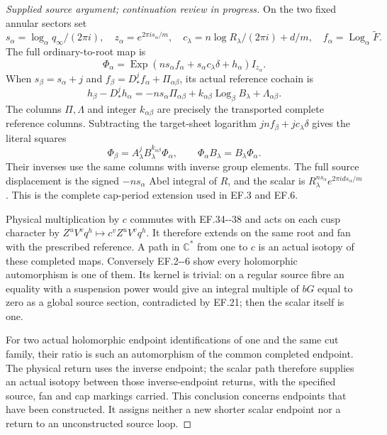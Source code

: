 \begin{proof}[Supplied source argument; continuation review in progress]
On the two fixed annular sectors set
\[
 s_\alpha=\log_\alpha q_\infty/(2\pi i),\quad
 z_\alpha=e^{2\pi i s_\alpha/m},\quad
 c_\lambda=n\log R_\lambda/(2\pi i)+d/m,\quad
 f_\alpha=\operatorname{Log}_\alpha\widetilde F.
\]
The full ordinary-to-root map is
\[
 \Phi_\alpha=\operatorname{Exp}
  (n s_\alpha f_\alpha+s_\alpha c_\lambda\delta+h_\alpha)
                                                     I_{z_\alpha}.
 \tag{EF.36}
\]
When \(s_\beta=s_\alpha+j\) and
\(f_\beta=D_*^jf_\alpha+\Pi_{\alpha\beta}\), its actual
reference cochain is
\[
 h_\beta-D_*^jh_\alpha
 =-n s_\alpha\Pi_{\alpha\beta}
       +k_{\alpha\beta}\operatorname{Log}_\beta B_\lambda
       +\Lambda_{\alpha\beta}.
 \tag{EF.37}
\]
The columns \(\Pi,\Lambda\) and integer \(k_{\alpha\beta}\)
are precisely the transported complete reference columns. Subtracting
the target-sheet logarithm \(jn f_\beta+jc_\lambda\delta\)
gives the literal squares
\[
 \Phi_\beta=A_\lambda^jB_\lambda^{k_{\alpha\beta}}\Phi_\alpha,
 \qquad \Phi_\alpha B_\lambda=B_\lambda\Phi_\alpha.
 \tag{EF.38}
\]
Their inverses use the same columns with inverse group elements. The
full source displacement is the signed \(-n s_\alpha\) Abel
integral of \(R\), and the scalar is
\(R_\lambda^{n s_\alpha}e^{2\pi i d s_\alpha/m}\).
This is the complete cap-period extension used in EF.3 and EF.6.

Physical multiplication by \(c\) commutes with EF.34-\/-38 and acts
on each cusp character by \(Z^uV^vq^h\mapsto c^vZ^uV^vq^h\).
It therefore extends on the same root and fan with the prescribed
reference. A path in \(\mathbb C^*\) from one to \(c\) is an
actual isotopy of these completed maps. Conversely EF.2-\/-6 show every
holomorphic automorphism is one of them. Its kernel is trivial: on a
regular source fibre an equality with a suspension power would give
an integral multiple of \(bG\) equal to zero as a global source
section, contradicted by EF.21; then the scalar itself is one.

For two actual holomorphic endpoint identifications of one and the
same cut family, their ratio is such an automorphism of the common
completed endpoint. The physical return uses the inverse endpoint;
the scalar path therefore supplies an actual isotopy between those
inverse-endpoint returns, with the specified source, fan and cap
markings carried. This conclusion concerns endpoints that have been
constructed. It assigns neither a new shorter scalar endpoint nor a
return to an unconstructed source loop.

\par


\end{proof}
